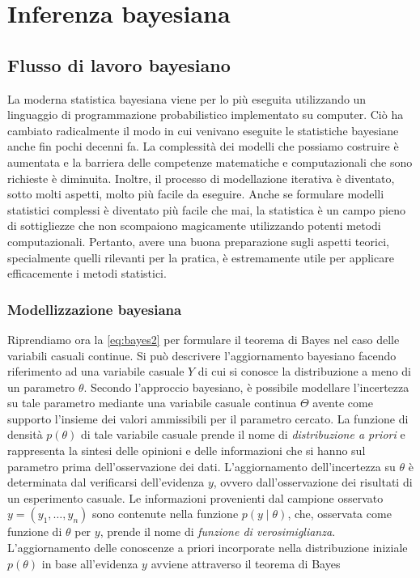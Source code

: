 \documentclass[
  11pt,
]{krantz}
\theoremstyle{definition}
\theoremstyle{definition}
\theoremstyle{definition}
\theoremstyle{definition}
\theoremstyle{remark}
\begin{document}
\mainmatter

\hypertarget{part-inferenza-bayesiana}{%
\part{Inferenza bayesiana}\label{part-inferenza-bayesiana}}

\hypertarget{ch:intro-bayes-inference}{%
\chapter{Flusso di lavoro bayesiano}\label{ch:intro-bayes-inference}}

La moderna statistica bayesiana viene per lo più eseguita utilizzando un linguaggio di programmazione probabilistico implementato su computer. Ciò ha cambiato radicalmente il modo in cui venivano eseguite le statistiche bayesiane anche fin pochi decenni fa. La complessità dei modelli che possiamo costruire è aumentata e la barriera delle competenze matematiche e computazionali che sono richieste è diminuita. Inoltre, il processo di modellazione iterativa è diventato, sotto molti aspetti, molto più facile da eseguire. Anche se formulare modelli statistici complessi è diventato più facile che mai, la statistica è un campo pieno di sottigliezze che non scompaiono magicamente utilizzando potenti metodi computazionali. Pertanto, avere una buona preparazione sugli aspetti teorici, specialmente quelli rilevanti per la pratica, è estremamente utile per applicare efficacemente i metodi statistici.

\hypertarget{modellizzazione-bayesiana}{%
\section{Modellizzazione bayesiana}\label{modellizzazione-bayesiana}}

Riprendiamo ora la \eqref{eq:bayes2} per formulare il teorema di Bayes nel caso delle variabili casuali continue. Si può descrivere l'aggiornamento bayesiano facendo riferimento ad una variabile casuale \(Y\) di cui si conosce la distribuzione a meno di un parametro \(\theta\). Secondo l'approccio bayesiano, è possibile modellare l'incertezza su tale parametro mediante una variabile casuale continua \(\Theta\) avente come supporto l'insieme dei valori ammissibili per il parametro cercato. La funzione di densità \(p(\theta)\) di tale variabile casuale prende il nome di \emph{distribuzione a priori} e rappresenta la sintesi delle opinioni e delle informazioni che si hanno sul parametro prima dell'osservazione dei dati. L'aggiornamento dell'incertezza su \(\theta\) è determinata dal verificarsi dell'evidenza \(y\), ovvero dall'osservazione dei risultati di un esperimento casuale. Le informazioni provenienti dal campione osservato \(y = (y_1, \dots, y_n)\) sono contenute nella funzione \(p(y \mid \theta)\), che, osservata come funzione di \(\theta\) per \(y\), prende il nome di \emph{funzione di verosimiglianza}. L'aggiornamento delle conoscenze a priori incorporate nella distribuzione iniziale \(p(\theta)\) in base all'evidenza \(y\) avviene attraverso il teorema di Bayes
\end{document}
